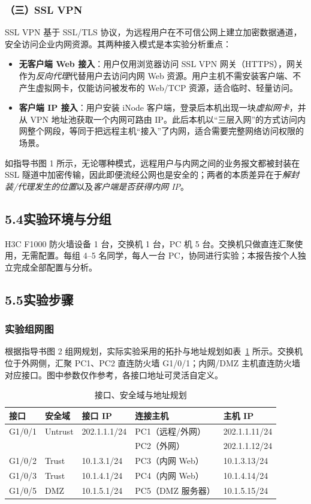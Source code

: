 \documentclass[12pt,a4paper]{article}
\begin{document}
\subsubsection*{（三）SSL VPN}
SSL VPN 基于 SSL/TLS 协议，为远程用户在不可信公网上建立加密数据通道，安全访问企业内网资源。其两种接入模式是本实验分析重点：
\begin{itemize}[leftmargin=1.6em]
  \item \textbf{无客户端 Web 接入}：用户仅用浏览器访问 SSL VPN 网关（HTTPS），网关作为\emph{反向代理}代替用户去访问内网 Web 资源。用户主机不需安装客户端、不产生虚拟网卡，仅能访问被发布的 Web/TCP 资源，适合临时、轻量访问。
  \item \textbf{客户端 IP 接入}：用户安装 iNode 客户端，登录后本机出现一块\emph{虚拟网卡}，并从 VPN 地址池获取一个内网可路由 IP。此后本机以“三层入网”的方式访问内网整个网段，等同于把远程主机“接入”了内网，适合需要完整网络访问权限的场景。
\end{itemize}
如指导书图 1 所示，无论哪种模式，远程用户与内网之间的业务报文都被封装在 SSL 隧道中加密传输，因此即便流经公网也是安全的；两者的本质差异在于\emph{解封装/代理发生的位置}以及\emph{客户端是否获得内网 IP}。

\subsection*{5.4\quad 实验环境与分组}
H3C F1000 防火墙设备 1 台，交换机 1 台，PC 机 5 台。交换机只做直连汇聚使用，无需配置。每组 4--5 名同学，每人一台 PC，协同进行实验；本报告按个人独立完成全部配置与分析。

\subsection*{5.5\quad 实验步骤}

\subsubsection*{实验组网图}
根据指导书图 2 组网规划，实际实验采用的拓扑与地址规划如表~\ref{tab:topo} 所示。交换机位于外网侧，汇聚 PC1、PC2 直连防火墙 G1/0/1；内网/DMZ 主机直连防火墙对应接口。图中参数仅作参考，各接口地址可灵活自定义。

\begin{table}[H]
\centering
\caption{接口、安全域与地址规划}
\label{tab:topo}
\small
\begin{tabular}{@{}llll l@{}}
\toprule
\textbf{接口} & \textbf{安全域} & \textbf{接口 IP} & \textbf{连接主机} & \textbf{主机 IP} \\
\midrule
G1/0/1 & Untrust & 202.1.1.1/24 & PC1（远程/外网） & 202.1.1.11/24 \\
       &         &              & PC2（外网） & 202.1.1.12/24 \\
G1/0/2 & Trust   & 10.1.3.1/24  & PC3（内网 Web） & 10.1.3.13/24 \\
G1/0/3 & Trust   & 10.1.4.1/24  & PC4（内网 Web） & 10.1.4.14/24 \\
G1/0/5 & DMZ     & 10.1.5.1/24  & PC5（DMZ 服务器） & 10.1.5.15/24 \\
\bottomrule
\end{tabular}
\end{table}
\end{document}
